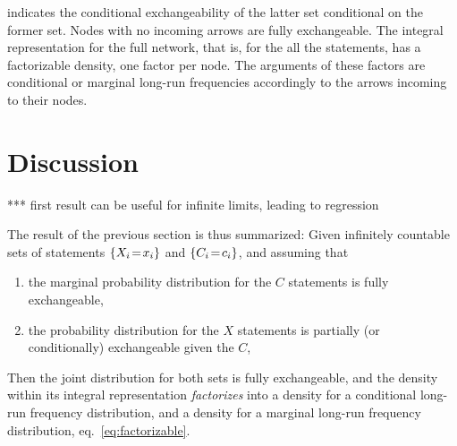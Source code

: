 \documentclass[\ifafour a4paper,12pt,\else a5paper,10pt,\fi%
onecolumn,oneside,article,%
british%
]{memoir}
\makeatletter
\newcommand*{\widefbox}[1]{\fbox{\hspace*{1ex}#1\hspace*{1ex}}}
\theoremstyle{remark}
\theoremstyle{innote}
\def\sum{\DOTSI\sumop\slimits@}
\newcommand*{\de}{\partialup}%
\DeclarePairedDelimiter\set{\{}{\}}
\newcommand*{\p}{\mathrm{P}}%
\renewcommand*{\|}[1][]{\nonscript\,#1\vert\nonscript\,\mathopen{}}
\newcommand*{\eqn}{eq.}%
\newcommand*{\tsum}{\mathop{\textstyle\sum}\nolimits}
\renewcommand*{\=}{\TextOrMath\texteq\eq}
\newcommand*{\X}[1]{X_{#1}}
\newcommand*{\x}[1]{x_{#1}}
\newcommand*{\C}[1]{C_{#1}}
\newcommand*{\cc}[1]{c_{#1}}
\makeatother
\begin{document}
indicates the conditional exchangeability of the latter set conditional on
the former set. Nodes with no incoming arrows are fully exchangeable. The
integral representation for the full network, that is, for the all the
statements, has a factorizable density, one factor per node. The arguments
of these factors are conditional or marginal long-run frequencies
accordingly to the arrows incoming to their nodes.


\section{Discussion}
\label{sec:discuss}

*** first result can be useful for infinite limits, leading to regression


The result of the previous section is thus summarized: Given infinitely
countable sets of statements $\set{\X{i}\=\x{i}}$ and
$\set{\C{i}\=\cc{i}}$, and assuming that
\begin{enumerate}[wide]
\item the marginal probability distribution for the $C$ statements is fully
  exchangeable,
\item the probability distribution for the $X$ statements is partially (or
  conditionally) exchangeable given the $C$,
\end{enumerate}
Then the joint distribution for both sets is fully exchangeable, and the
density within its integral representation \emph{factorizes} into a density
for a conditional long-run frequency distribution, and a density for a
marginal long-run frequency distribution, \eqn~\eqref{eq:factorizable}.






\end{document}
